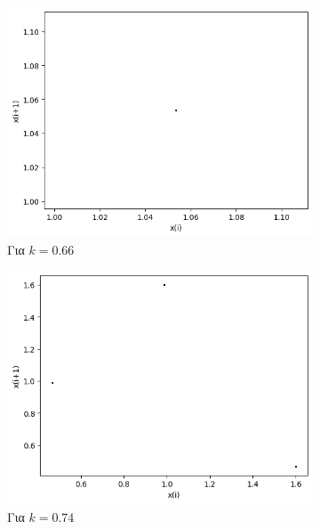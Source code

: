 \begin{figure}[ht]
	\centering
	\begin{subfigure}[b]{0.4\textwidth}
		\centering
		\includegraphics[width=\textwidth]{LateX images/graphs q19/g9}
		\caption{Για $k=0.66$}
		\label{f:k98}
	\end{subfigure}
	\hfill
	\begin{subfigure}[b]{0.4\textwidth}
		\centering
		\includegraphics[width=\textwidth]{LateX images/graphs q19/g10}
		\caption{Για $k=0.74$}
		\label{f:k99}
	\end{subfigure}
	\hfill
	\begin{subfigure}[b]{0.4\textwidth}
		\centering

\end{subfigure}
\end{figure}
